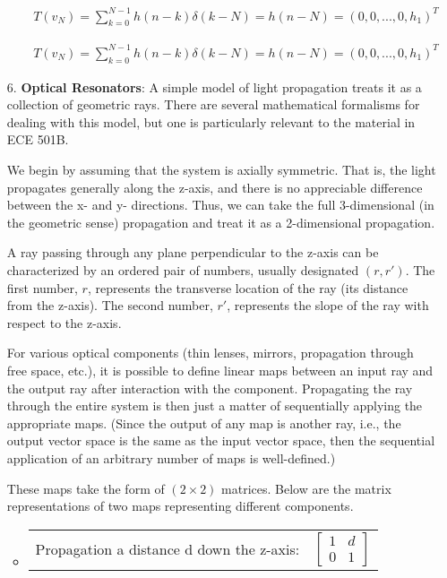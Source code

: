 \documentclass[fleqn]{article}
\begin{document}
\begin{enumerate}[nolistsep]
\begin{enumerate}
			\begin{align*}
				T(v_N) = \sum_{k=0}^{N-1}{h(n-k)\delta(k-N)} = h(n-N) = (0, 0,...,0,h_1)^T
			\end{align*}
			
			\begin{align*}
				T(v_N) = \sum_{k=0}^{N-1}{h(n-k)\delta(k-N)} = h(n-N) = (0, 0,...,0,h_1)^T
			\end{align*}
		\end{enumerate}
		\item[6.] \textbf{Optical Resonators}: A simple model of light propagation treats it as a collection of geometric rays. There are several mathematical formalisms for dealing with this model, but one is particularly relevant to the material in ECE 501B.

			We begin by assuming that the system is axially symmetric. That is, the light propagates generally along the z-axis, and there is no appreciable difference between the x- and y- directions. Thus, we can take the full 3-dimensional (in the geometric sense) propagation and treat it as a 2-dimensional propagation.

			A ray passing through any plane perpendicular to the z-axis can be characterized by an ordered pair of numbers, usually designated $(r, r')$. The first number, $r$, represents the transverse location of the ray (its distance from the z-axis). The second number, $r'$, represents the slope of the ray with respect to the z-axis.
			
			For various optical components (thin lenses, mirrors, propagation through free space, etc.), it is possible to define linear maps between an input ray and the output ray after interaction with the component. Propagating the ray through the entire system is then just a matter of sequentially applying the appropriate maps. (Since the output of any map is another ray, i.e., the output vector space is the same as the input vector space, then the sequential application of an arbitrary number of maps is well-defined.)
			
			These maps take the form of $(2 \times 2)$ matrices. Below are the matrix representations of two maps representing different components.
			
			\begingroup
			\renewcommand*{\arraystretch}{0.6}
			\begin{itemize}
				\item
					\begin{tabularx}{0.85\textwidth}{>{\hsize=0.75\hsize}X >{\hsize=0.25\hsize}X}
						Propagation a distance d down the z-axis: & $\begin{bmatrix}
							1 & d\\
							0 & 1
							\end{bmatrix}$
					\end{tabularx}
					

\end{itemize}
\end{enumerate}
\end{document}
